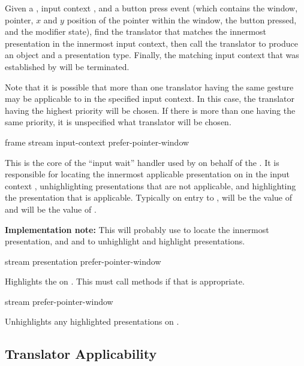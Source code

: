 Given a  , input context
, and a button press event (which contains the window,
pointer, $x$ and $y$ position of the pointer within the window, the button
pressed, and the modifier state), find the translator that matches the innermost
presentation in the innermost input context, then call the translator to produce
an object and a presentation type.  Finally, the matching input context that was
established by  will be terminated.

Note that it is possible that more than one translator having the same gesture
may be applicable to  in the specified input context.  In this
case, the translator having the highest priority will be chosen.  If there is
more than one having the same priority, it is unspecified what translator will
be chosen.


 {frame stream input-context
                                            \optional prefer-pointer-window}

This is the core of the ``input wait'' handler used by 
on behalf of the  .  It is responsible for
locating the innermost applicable presentation on  in the input
context , unhighlighting presentations that are not
applicable, and highlighting the presentation that is applicable.  Typically on
entry to ,  will be the
value of  and  will be the value of
.

{\bf Implementation note:} This will probably use
 to locate the
innermost presentation, and  and
 to unhighlight and highlight presentations.


 {stream presentation \optional prefer-pointer-window}

Highlights the   on .  This
must call  methods if that is appropriate.


 {stream \optional prefer-pointer-window}

Unhighlights any highlighted presentations on .


\subsection {Translator Applicability}

